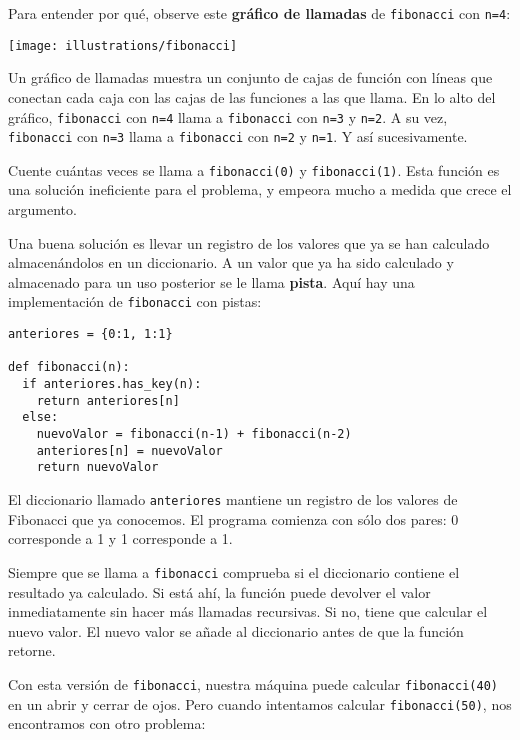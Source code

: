 Para entender por qué, observe este \textbf{gráfico de llamadas} de
\texttt{fibonacci} con \texttt{n=4}:

\beforefig \centerline{\texttt{[image: illustrations/fibonacci]}}
\afterfig

Un gráfico de llamadas muestra un conjunto de cajas de función con
líneas que conectan cada caja con las cajas de las funciones a las
que llama. En lo alto del gráfico, \texttt{fibonacci} con \texttt{n=4}
llama a \texttt{fibonacci} con \texttt{n=3} y \texttt{n=2}. A su vez,
\texttt{fibonacci} con \texttt{n=3} llama a \texttt{fibonacci} con
\texttt{n=2} y \texttt{n=1}. Y así sucesivamente.

  

Cuente cuántas veces se llama a \texttt{fibonacci(0)} y \texttt{fibonacci(1)}.
Esta función es una solución ineficiente para el problema, y empeora
mucho a medida que crece el argumento.

Una buena solución es llevar un registro de los valores que ya se
han calculado almacenándolos en un diccionario. A un valor que ya
ha sido calculado y almacenado para un uso posterior se le llama \textbf{pista}.
Aquí hay una implementación de \texttt{fibonacci} con pistas:
\begin{lstlisting}
anteriores = {0:1, 1:1}

def fibonacci(n):
  if anteriores.has_key(n):
    return anteriores[n]
  else:
    nuevoValor = fibonacci(n-1) + fibonacci(n-2)
    anteriores[n] = nuevoValor
    return nuevoValor
\end{lstlisting}

El diccionario llamado \texttt{anteriores} mantiene un registro de
los valores de Fibonacci que ya conocemos. El programa comienza con
sólo dos pares: 0 corresponde a 1 y 1 corresponde a 1.

Siempre que se llama a \texttt{fibonacci} comprueba si el diccionario
contiene el resultado ya calculado. Si está ahí, la función puede
devolver el valor inmediatamente sin hacer más llamadas recursivas.
Si no, tiene que calcular el nuevo valor. El nuevo valor se añade
al diccionario antes de que la función retorne.

Con esta versión de \texttt{fibonacci}, nuestra máquina puede calcular
\texttt{fibonacci(40)} en un abrir y cerrar de ojos. Pero cuando intentamos
calcular \texttt{fibonacci(50)}, nos encontramos con otro problema:

 

